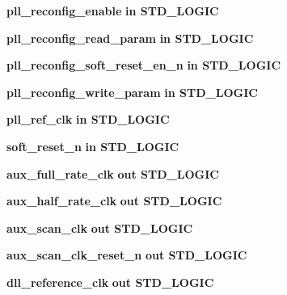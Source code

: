 \begin{DoxyCompactItemize}
\item 
{\bf pll\+\_\+reconfig\+\_\+enable}  {\bfseries {\bfseries \textcolor{keywordflow}{in}\textcolor{vhdlchar}{ }}} {\bfseries \textcolor{comment}{S\+T\+D\+\_\+\+L\+O\+G\+IC}\textcolor{vhdlchar}{ }} 
\item 
{\bf pll\+\_\+reconfig\+\_\+read\+\_\+param}  {\bfseries {\bfseries \textcolor{keywordflow}{in}\textcolor{vhdlchar}{ }}} {\bfseries \textcolor{comment}{S\+T\+D\+\_\+\+L\+O\+G\+IC}\textcolor{vhdlchar}{ }} 
\item 
{\bf pll\+\_\+reconfig\+\_\+soft\+\_\+reset\+\_\+en\+\_\+n}  {\bfseries {\bfseries \textcolor{keywordflow}{in}\textcolor{vhdlchar}{ }}} {\bfseries \textcolor{comment}{S\+T\+D\+\_\+\+L\+O\+G\+IC}\textcolor{vhdlchar}{ }} 
\item 
{\bf pll\+\_\+reconfig\+\_\+write\+\_\+param}  {\bfseries {\bfseries \textcolor{keywordflow}{in}\textcolor{vhdlchar}{ }}} {\bfseries \textcolor{comment}{S\+T\+D\+\_\+\+L\+O\+G\+IC}\textcolor{vhdlchar}{ }} 
\item 
{\bf pll\+\_\+ref\+\_\+clk}  {\bfseries {\bfseries \textcolor{keywordflow}{in}\textcolor{vhdlchar}{ }}} {\bfseries \textcolor{comment}{S\+T\+D\+\_\+\+L\+O\+G\+IC}\textcolor{vhdlchar}{ }} 
\item 
{\bf soft\+\_\+reset\+\_\+n}  {\bfseries {\bfseries \textcolor{keywordflow}{in}\textcolor{vhdlchar}{ }}} {\bfseries \textcolor{comment}{S\+T\+D\+\_\+\+L\+O\+G\+IC}\textcolor{vhdlchar}{ }} 
\item 
{\bf aux\+\_\+full\+\_\+rate\+\_\+clk}  {\bfseries {\bfseries \textcolor{keywordflow}{out}\textcolor{vhdlchar}{ }}} {\bfseries \textcolor{comment}{S\+T\+D\+\_\+\+L\+O\+G\+IC}\textcolor{vhdlchar}{ }} 
\item 
{\bf aux\+\_\+half\+\_\+rate\+\_\+clk}  {\bfseries {\bfseries \textcolor{keywordflow}{out}\textcolor{vhdlchar}{ }}} {\bfseries \textcolor{comment}{S\+T\+D\+\_\+\+L\+O\+G\+IC}\textcolor{vhdlchar}{ }} 
\item 
{\bf aux\+\_\+scan\+\_\+clk}  {\bfseries {\bfseries \textcolor{keywordflow}{out}\textcolor{vhdlchar}{ }}} {\bfseries \textcolor{comment}{S\+T\+D\+\_\+\+L\+O\+G\+IC}\textcolor{vhdlchar}{ }} 
\item 
{\bf aux\+\_\+scan\+\_\+clk\+\_\+reset\+\_\+n}  {\bfseries {\bfseries \textcolor{keywordflow}{out}\textcolor{vhdlchar}{ }}} {\bfseries \textcolor{comment}{S\+T\+D\+\_\+\+L\+O\+G\+IC}\textcolor{vhdlchar}{ }} 
\item 
{\bf dll\+\_\+reference\+\_\+clk}  {\bfseries {\bfseries \textcolor{keywordflow}{out}\textcolor{vhdlchar}{ }}} {\bfseries \textcolor{comment}{S\+T\+D\+\_\+\+L\+O\+G\+IC}\textcolor{vhdlchar}{ }} 

\end{DoxyCompactItemize}
